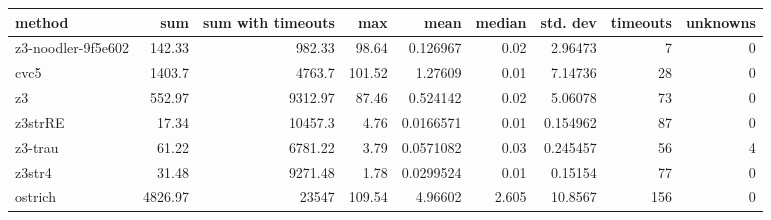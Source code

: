 \begin{tabular}{lrrrrrrrr}
\hline
 method             &     sum &   sum with timeouts &    max &      mean &   median &   std. dev &   timeouts &   unknowns \\
\hline
 z3-noodler-9f5e602 &  142.33 &              982.33 &  98.64 & 0.126967  &    0.02  &   2.96473  &          7 &          0 \\
 cvc5               & 1403.7  &             4763.7  & 101.52 & 1.27609   &    0.01  &   7.14736  &         28 &          0 \\
 z3                 &  552.97 &             9312.97 &  87.46 & 0.524142  &    0.02  &   5.06078  &         73 &          0 \\
 z3strRE            &   17.34 &            10457.3  &   4.76 & 0.0166571 &    0.01  &   0.154962 &         87 &          0 \\
 z3-trau            &   61.22 &             6781.22 &   3.79 & 0.0571082 &    0.03  &   0.245457 &         56 &          4 \\
 z3str4             &   31.48 &             9271.48 &   1.78 & 0.0299524 &    0.01  &   0.15154  &         77 &          0 \\
 ostrich            & 4826.97 &            23547    & 109.54 & 4.96602   &    2.605 &  10.8567   &        156 &          0 \\
\hline
\end{tabular}
